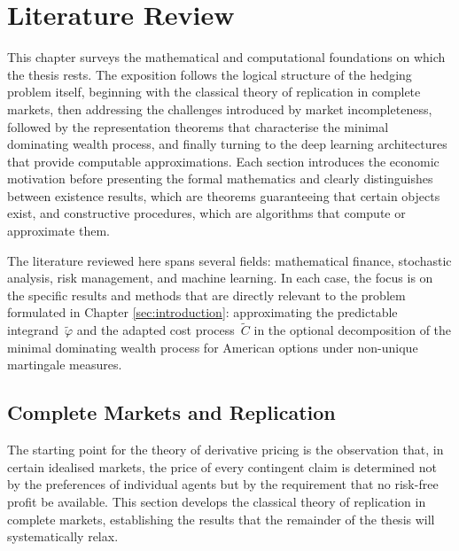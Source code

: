 \section{Literature Review}
\label{sec:literature_review}

This chapter surveys the mathematical and computational foundations on which the thesis rests. The exposition follows the logical structure of the hedging problem itself, beginning with the classical theory of replication in complete markets, then addressing the challenges introduced by market incompleteness, followed by the representation theorems that characterise the minimal dominating wealth process, and finally turning to the deep learning architectures that provide computable approximations. Each section introduces the economic motivation before presenting the formal mathematics and clearly distinguishes between existence results, which are theorems guaranteeing that certain objects exist, and constructive procedures, which are algorithms that compute or approximate them.


The literature reviewed here spans several fields: mathematical finance,
stochastic analysis, risk management, and machine learning.  In each
case, the focus is on the specific results and methods that are directly
relevant to the problem formulated in Chapter \ref{sec:introduction}: approximating the
predictable integrand~$\tilde{\varphi}$ and the adapted cost
process~$\tilde{C}$ in the optional decomposition of the minimal
dominating wealth process for American options under non-unique martingale
measures.


\subsection{Complete Markets and Replication}
\label{subsec:complete_markets}

The starting point for the theory of derivative pricing is the observation
that, in certain idealised markets, the price of every contingent claim is
determined not by the preferences of individual agents but by the
requirement that no risk-free profit be available.  This section develops
the classical theory of replication in complete markets, establishing the
results that the remainder of the thesis will systematically relax.

